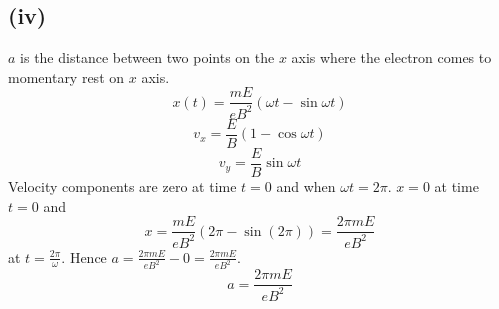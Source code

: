 \documentclass[12pt]{article}
\begin{document}
\subsection*{(iv)}
$a$ is the distance between two points on the $x$ axis where the electron comes to momentary rest on $x$ axis.
\[x(t)=\frac{mE}{eB^2}\left(\omega{t}-\sin{\omega{t}}\right)\]
\[v_x=\frac{E}{B}(1-\cos{\omega{t}})\]
\[v_y=\frac{E}{B}\sin{\omega{t}}\]
Velocity components are zero at time $t=0$ and when $\omega{t}=2\pi$.
$x=0$ at time $t=0$ and $$x=\frac{mE}{eB^2}\left(2\pi-\sin{(2\pi)}\right)=\frac{2\pi{m}E}{eB^2}$$ at  $t=\frac{2\pi}{\omega}$.
Hence $a=\frac{2\pi{m}E}{eB^2}-0=\frac{2\pi{m}E}{eB^2}$.
\[\boxed{a=\frac{2\pi{m}E}{eB^2}}\]
\end{document}

